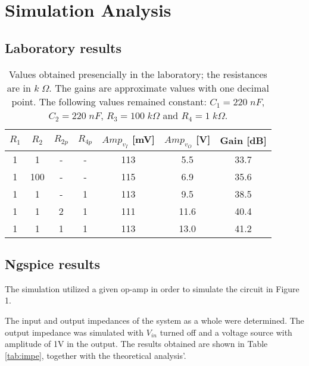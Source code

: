 \section{Simulation Analysis} \label{sec:simulation}

\subsection{Laboratory results} \label{subsec:laboratory_results}

\begin{table}[H]
    \centering
    \begin{tabular}{|c|c|c|c|c|c|c|}
        \hline
        $R_1$ & $R_2$ & $R_{2p}$ & $R_{4p}$ & $Amp_{v_I}$ [mV] & $Amp_{v_O}$ [V] & Gain [dB]\\
        \hline
        1 & 1 & - & - & 113 & 5.5 & 33.7 \\
        1 & 100 & - & - & 115 & 6.9 & 35.6 \\
        1 & 1 & - & 1 & 113 & 9.5 & 38.5 \\
        1 & 1 & 2 & 1 & 111 & 11.6 & 40.4 \\
        1 & 1 & 1 & 1 & 113 & 13.0 & 41.2 \\
        \hline
    \end{tabular}
    \caption{Values obtained presencially in the laboratory; the resistances are in $k\;\Omega$. The gains are approximate values with one decimal point. The following values remained constant: $C_1=220\;nF$, $C_2=220\;nF$, $R_3=100\;k\Omega$ and $R_4=1\;k\Omega$.}
    \label{tab:lab_results}
\end{table}

\subsection{Ngspice results} \label{subsec:ngspice_results}

The simulation utilized a given op-amp in order to simulate the circuit in Figure 1. 



The input and output impedances of the system as a whole were determined. The output impedance was simulated with $V_{in}$ turned off and a voltage source with amplitude of 1V in the output. The results obtained are shown in Table \ref{tab:impe}, together with the theoretical analysis'.

